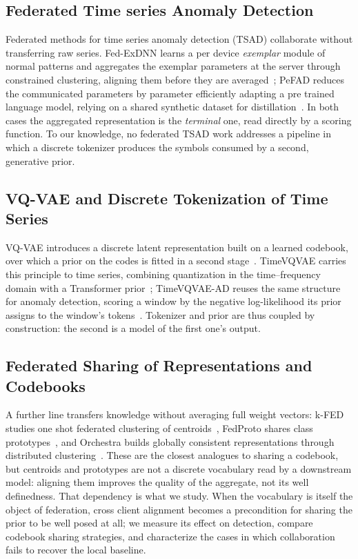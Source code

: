 \documentclass[conference]{IEEEtran}
\begin{document}
\subsection{Federated Time series Anomaly Detection}

Federated methods for time series anomaly detection (TSAD) collaborate without transferring
raw series. Fed-ExDNN learns a per device \emph{exemplar} module of normal patterns and
aggregates the exemplar parameters at the server through constrained clustering, aligning
them before they are averaged~\cite{zhu2022fedexdnn}; PeFAD reduces the communicated
parameters by parameter efficiently adapting a pre trained language model, relying on a
shared synthetic dataset for distillation~\cite{xu2024pefad}. In both cases the aggregated
representation is the \emph{terminal} one, read directly by a scoring function. To our
knowledge, no federated TSAD work addresses a pipeline in which a discrete tokenizer produces
the symbols consumed by a second, generative prior.

\subsection{VQ-VAE and Discrete Tokenization of Time Series}

VQ-VAE introduces a discrete latent representation built on a learned codebook, over which a
prior on the codes is fitted in a second stage~\cite{van2017neural}. TimeVQVAE carries this
principle to time series, combining quantization in the time--frequency domain with a
Transformer prior~\cite{lee2023timevqvae}; TimeVQVAE-AD reuses the same structure for
anomaly detection, scoring a window by the negative log-likelihood its prior assigns to the
window's tokens~\cite{lee2024timevqvaead}. Tokenizer and prior are thus coupled by
construction: the second is a model of the first one's output.

\subsection{Federated Sharing of Representations and Codebooks}

A further line transfers knowledge without averaging full weight vectors: k-FED studies
one shot federated clustering of centroids~\cite{dennis2021kfed}, FedProto shares class
prototypes~\cite{tan2022fedproto}, and Orchestra builds globally consistent representations
through distributed clustering~\cite{lubana2022orchestra}. These are the closest analogues
to sharing a codebook, but centroids and prototypes are not a discrete vocabulary read by a
downstream model: aligning them improves the quality of the aggregate, not its
well definedness. That dependency is what we study. When the vocabulary is itself the object
of federation, cross client alignment becomes a precondition for sharing the prior to be
well posed at all; we measure its effect on detection, compare codebook sharing strategies,
and characterize the cases in which collaboration fails to recover the local baseline.
\end{document}
